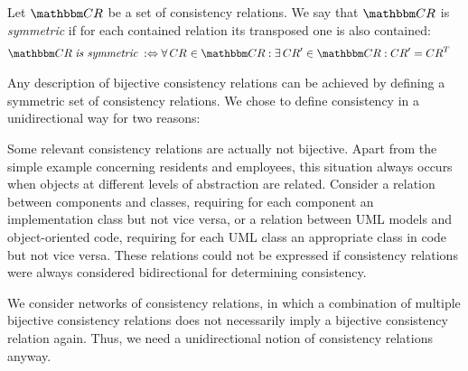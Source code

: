 \begin{definition}
    Let $\consistencyrelationset{CR}$ be a set of consistency relations.
    We say that $\consistencyrelationset{CR}$ is \emph{symmetric} if for each contained relation its transposed one is also contained:
    \begin{align*}
        &
        \consistencyrelationset{CR} \mathtextspacearound{is symmetric} \equivalentperdefinition %
        \forall \consistencyrelation{CR}{} \in \consistencyrelationset{CR} :
        \exists \consistencyrelation{CR}{}' \in \consistencyrelationset{CR} :
        \consistencyrelation{CR}{}' = \consistencyrelation{CR}{}^T
    \end{align*}
\end{definition}

Any description of bijective consistency relations can be achieved by defining a symmetric set of consistency relations.
We chose to define consistency in a unidirectional way for two reasons:
\begin{longenumerate}
    \item Some relevant consistency relations are actually not bijective. 
    Apart from the simple example concerning residents and employees, this situation always occurs when objects at different levels of abstraction are related.
    Consider a relation between components and classes, requiring for each component an implementation class but not vice versa, or a relation between \gls{UML} models and object-oriented code, requiring for each \gls{UML} class an appropriate class in code but not vice versa.
    These relations could not be expressed if consistency relations were always considered bidirectional for determining consistency.
    \item We consider networks of consistency relations, in which a combination of multiple bijective consistency relations does not necessarily imply a bijective consistency relation again. 
    Thus, we need a unidirectional notion of consistency relations anyway.
\end{longenumerate}


